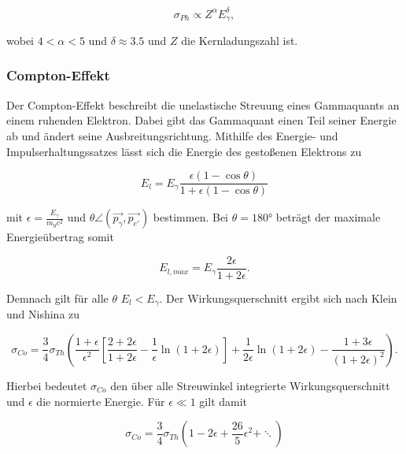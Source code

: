 \begin{equation*}
    \sigma_{Ph} \propto Z^\alpha E_\gamma^\delta,
\end{equation*}

wobei $\num{4}<\alpha<\num{5}$ und $\delta \approx \num{3.5} $ und $Z$ die Kernladungszahl ist.

\subsubsection{Compton-Effekt}

Der Compton-Effekt beschreibt die unelastische Streuung eines Gammaquants an einem ruhenden Elektron. Dabei gibt das Gammaquant einen Teil seiner Energie ab 
und ändert seine Ausbreitungsrichtung. Mithilfe des Energie- und Impulserhaltungssatzes lässt sich die Energie des gestoßenen Elektrons zu 

\begin{equation}
    E_l = E_\gamma \frac{\epsilon\left(1-\cos{\theta}\right)}{1+\epsilon\left(1-\cos{\theta}\right)}
    \label{eqn:Compton}
\end{equation}

mit $\epsilon = \frac{E_\gamma}{m_0 c^2}$ und $\theta \angle (\vec{p_\gamma}, \vec{p_{e'}})$ bestimmen. Bei $\theta = 180°$ beträgt der 
maximale Energieübertrag somit

\begin{equation}
    E_{l,max} = E_\gamma \frac{2\epsilon}{1+2\epsilon}.
    \label{eqn:Kante}
\end{equation}

Demnach gilt für alle $\theta$ $E_l < E_\gamma$. Der Wirkungsquerschnitt ergibt sich nach Klein und Nishina zu 

\begin{equation*}
    \sigma_{Co} = \frac{3}{4}\sigma_{Th}\left(\frac{1+\epsilon}{\epsilon^2}\left[\frac{2+2\epsilon}{1+2\epsilon}-\frac{1}{\epsilon}\ln{\left(1+2\epsilon\right)}\right]+\frac{1}{2\epsilon}\ln{\left(1+2\epsilon\right)}-\frac{1+3\epsilon}{\left(1+2\epsilon\right)^2}\right).
\end{equation*}

Hierbei bedeutet $\sigma_{Co}$ den über alle Streuwinkel integrierte Wirkungsquerschnitt und $\epsilon$ die normierte Energie. 
Für $\epsilon \ll 1$ gilt damit

\begin{equation*}
    \sigma_{Co} = \frac{3}{4}\sigma_{Th}\left(1-2\epsilon+\frac{26}{5}\epsilon^2+\ddots\right)
\end{equation*}

